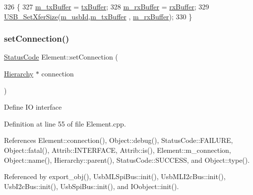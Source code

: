 \begin{DoxyCode}
326                                               \{
327     \hyperlink{classUsbFTInterface_a10385649160531f6976d55176bee1f2d}{m\_txBuffer} = \hyperlink{classUsbFTInterface_acac73d3fc1587437656bb7fe24e10906}{txBuffer};
328     \hyperlink{classUsbFTInterface_a7007c5112d381f5caefa133a42bd900d}{m\_rxBuffer} = \hyperlink{classUsbFTInterface_a836d1a8d181fd49e11235bb677e3fa7e}{rxBuffer};
329     \hyperlink{LALUsbML_8h_a671ccd24a9539d26bae5926a06662129}{USB\_SetXferSize}(\hyperlink{classUsbFTInterface_a91df5c0547e8be460bc087e27afe05aa}{m\_usbId},\hyperlink{classUsbFTInterface_a10385649160531f6976d55176bee1f2d}{m\_txBuffer} , 
      \hyperlink{classUsbFTInterface_a7007c5112d381f5caefa133a42bd900d}{m\_rxBuffer});
330   \}
\end{DoxyCode}
\mbox{\label{classElement_ab476b4b1df5954141ceb14f072433b89}} 
\subsubsection{\texorpdfstring{set\+Connection()}{setConnection()}}
{\footnotesize\ttfamily \hyperlink{classStatusCode}{Status\+Code} Element\+::set\+Connection (\begin{DoxyParamCaption}\item[{\hyperlink{classHierarchy}{Hierarchy} $\ast$}]{connection }\end{DoxyParamCaption})\hspace{0.3cm}{\ttfamily [inherited]}}

Define IO interface 

Definition at line 55 of file Element.\+cpp.



References Element\+::connection(), Object\+::debug(), Status\+Code\+::\+F\+A\+I\+L\+U\+RE, Object\+::fatal(), Attrib\+::\+I\+N\+T\+E\+R\+F\+A\+CE, Attrib\+::is(), Element\+::m\+\_\+connection, Object\+::name(), Hierarchy\+::parent(), Status\+Code\+::\+S\+U\+C\+C\+E\+SS, and Object\+::type().



Referenced by export\+\_\+obj(), Usb\+M\+L\+Spi\+Bus\+::init(), Usb\+M\+L\+I2c\+Bus\+::init(), Usb\+I2c\+Bus\+::init(), Usb\+Spi\+Bus\+::init(), and I\+Oobject\+::init().


